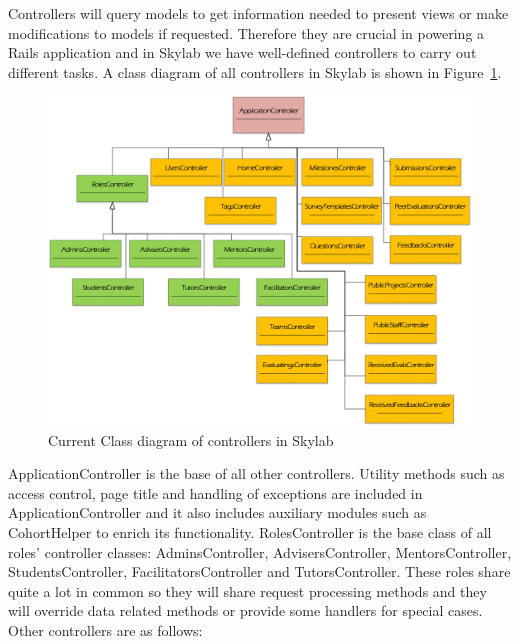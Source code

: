 Controllers will query models to get information needed to present views or make modifications to models if requested. Therefore they are crucial in powering a Rails application and in Skylab we have well-defined controllers to carry out different tasks. A class diagram of all controllers in Skylab is shown in Figure~\ref{fig:SkylabControllers}.

\begin{figure}[h]
  \centering
  \includegraphics[width=\textwidth]{Images/Skylab_Controllers.png}
  \caption{Current Class diagram of controllers in Skylab}
  \label{fig:SkylabControllers}
\end{figure}

ApplicationController is the base of all other controllers. Utility methods such as access control, page title and handling of exceptions are included in ApplicationController and it also includes auxiliary modules such as CohortHelper to enrich its functionality. RolesController is the base class of all roles' controller classes: AdminsController, AdvisersController, MentorsController, StudentsController, FacilitatorsController and TutorsController. These roles share quite a lot in common so they will share request processing methods and they will override data related methods or provide some handlers for special cases. Other controllers are as follows:

